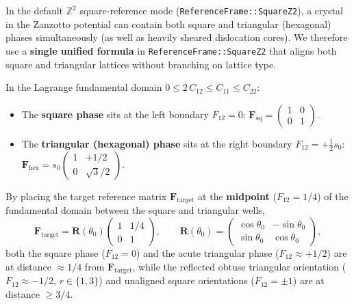 \documentclass[11pt,a4paper]{article}
\newcommand{\Z}{\mathbb{Z}}
\newcommand{\code}[1]{\texttt{#1}}
\begin{document}
In the default $\Z^2$ square-reference mode (\code{ReferenceFrame::SquareZ2}), a crystal in the Zanzotto potential can contain both square and triangular (hexagonal) phases simultaneously (as well as heavily sheared dislocation cores). We therefore use a \textbf{single unified formula} in \code{ReferenceFrame::SquareZ2} that aligns both square and triangular lattices without branching on lattice type.

In the Lagrange fundamental domain $0 \le 2\,C_{12} \le C_{11} \le C_{22}$:
\begin{itemize}[noitemsep]
  \item The \textbf{square phase} sits at the left boundary $F_{12} = 0$: $\mathbf{F}_{\text{sq}} = \begin{pmatrix} 1 & 0 \\ 0 & 1 \end{pmatrix}$.
  \item The \textbf{triangular (hexagonal) phase} sits at the right boundary $F_{12} = +\tfrac{1}{2}s_0$: $\mathbf{F}_{\text{hex}} = s_0\begin{pmatrix} 1 & +1/2 \\ 0 & \sqrt{3}/2 \end{pmatrix}$.
\end{itemize}
By placing the target reference matrix $\mathbf{F}_{\text{target}}$ at the \textbf{midpoint} ($F_{12} = 1/4$) of the fundamental domain between the square and triangular wells,
\begin{equation}
  \mathbf{F}_{\text{target}} = \mathbf{R}(\theta_0)
  \begin{pmatrix}
    1 & 1/4 \\
    0 & 1
  \end{pmatrix},
  \qquad
  \mathbf{R}(\theta_0) =
  \begin{pmatrix}
    \cos\theta_0 & -\sin\theta_0 \\
    \sin\theta_0 & \cos\theta_0
  \end{pmatrix},
\end{equation}
both the square phase ($F_{12}=0$) and the acute triangular phase ($F_{12} \approx +1/2$) are at distance $\approx 1/4$ from $\mathbf{F}_{\text{target}}$, while the reflected obtuse triangular orientation ($F_{12} \approx -1/2$, $r \in \{1,3\}$) and unaligned square orientations ($F_{12}=\pm 1$) are at distance $\ge 3/4$.
\end{document}
